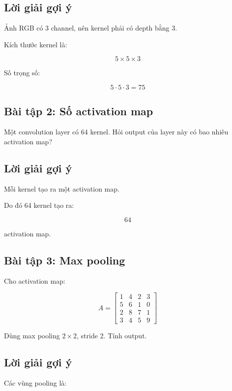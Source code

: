 \subsection*{Lời giải gợi ý}

Ảnh RGB có 3 channel, nên kernel phải có depth bằng 3.

Kích thước kernel là:

\[
    5\times5\times3
\]

Số trọng số:

\[
    5\cdot5\cdot3=75
\]

\subsection*{Bài tập 2: Số activation map}

Một convolution layer có 64 kernel. Hỏi output của layer này có bao nhiêu activation map?

\subsection*{Lời giải gợi ý}

Mỗi kernel tạo ra một activation map.

Do đó 64 kernel tạo ra:

\[
    64
\]

activation map.

\subsection*{Bài tập 3: Max pooling}

Cho activation map:

\[
    A =
    \begin{bmatrix}
    1 & 4 & 2 & 3\\
    5 & 6 & 1 & 0\\
    2 & 8 & 7 & 1\\
    3 & 4 & 5 & 9
    \end{bmatrix}
\]

Dùng max pooling $2\times2$, stride 2. Tính output.

\subsection*{Lời giải gợi ý}

Các vùng pooling là:

